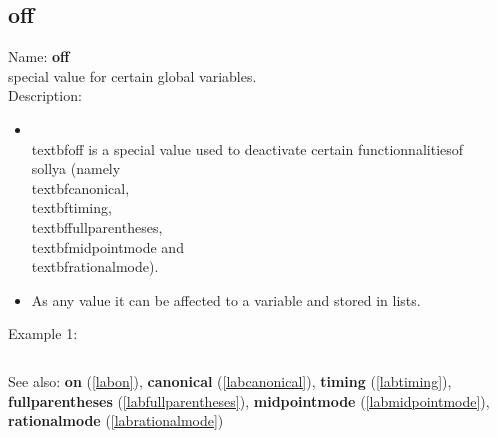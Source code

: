 \subsection{off}
\label{laboff}
\noindent Name: \textbf{off}\\
special value for certain global variables.\\
\noindent Description: \begin{itemize}

\item \\textbf{off} is a special value used to deactivate certain functionnalities\n   of \\sollya (namely \\textbf{canonical}, \\textbf{timing}, \\textbf{fullparentheses}, \\textbf{midpointmode} and \\textbf{rationalmode}).\n
\item As any value it can be affected to a variable and stored in lists.\n\end{itemize}
\noindent Example 1: 
\begin{center}\begin{minipage}{15cm}\begin{Verbatim}[frame=single]
\end{Verbatim}
\end{minipage}\end{center}
See also: \textbf{on} (\ref{labon}), \textbf{canonical} (\ref{labcanonical}), \textbf{timing} (\ref{labtiming}), \textbf{fullparentheses} (\ref{labfullparentheses}), \textbf{midpointmode} (\ref{labmidpointmode}), \textbf{rationalmode} (\ref{labrationalmode})
